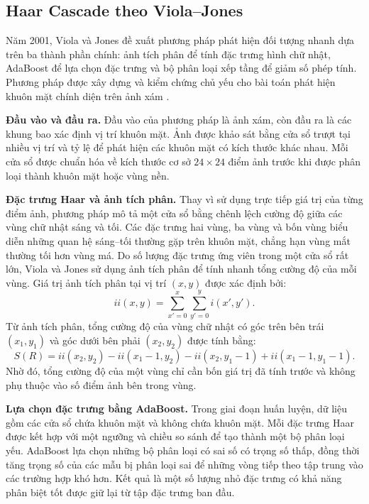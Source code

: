 \documentclass[../LuanVan.tex]{subfiles}
\begin{document}
\subsection{Haar Cascade theo Viola--Jones}
\label{subsection:2.2.1}

Năm 2001, Viola và Jones đề xuất phương pháp phát hiện đối tượng nhanh dựa trên ba thành phần chính: ảnh tích phân để tính đặc trưng hình chữ nhật, AdaBoost để lựa chọn đặc trưng và bộ phân loại xếp tầng để giảm số phép tính. Phương pháp được xây dựng và kiểm chứng chủ yếu cho bài toán phát hiện khuôn mặt chính diện trên ảnh xám \cite{viola2001rapid}.

\noindent\textbf{Đầu vào và đầu ra.} Đầu vào của phương pháp là ảnh xám, còn đầu ra là các khung bao xác định vị trí khuôn mặt. Ảnh được khảo sát bằng cửa sổ trượt tại nhiều vị trí và tỷ lệ để phát hiện các khuôn mặt có kích thước khác nhau. Mỗi cửa sổ được chuẩn hóa về kích thước cơ sở $24\times24$ điểm ảnh trước khi được phân loại thành khuôn mặt hoặc vùng nền.

\noindent\textbf{Đặc trưng Haar và ảnh tích phân.} Thay vì sử dụng trực tiếp giá trị của từng điểm ảnh, phương pháp mô tả một cửa sổ bằng chênh lệch cường độ giữa các vùng chữ nhật sáng và tối. Các đặc trưng hai vùng, ba vùng và bốn vùng biểu diễn những quan hệ sáng--tối thường gặp trên khuôn mặt, chẳng hạn vùng mắt thường tối hơn vùng má. Do số lượng đặc trưng ứng viên trong một cửa sổ rất lớn, Viola và Jones sử dụng ảnh tích phân để tính nhanh tổng cường độ của mỗi vùng. Giá trị ảnh tích phân tại vị trí $(x,y)$ được xác định bởi:
\begin{equation}
    ii(x,y)=\sum_{x'=0}^{x}\sum_{y'=0}^{y}i(x',y').
    \label{eq:integral_image}
\end{equation}
Từ ảnh tích phân, tổng cường độ của vùng chữ nhật có góc trên bên trái $(x_1,y_1)$ và góc dưới bên phải $(x_2,y_2)$ được tính bằng:
\begin{equation}
    S(R)=ii(x_2,y_2)-ii(x_1-1,y_2)-ii(x_2,y_1-1)+ii(x_1-1,y_1-1).
    \label{eq:rectangle_sum}
\end{equation}
Nhờ đó, tổng cường độ của một vùng chỉ cần bốn giá trị đã tính trước và không phụ thuộc vào số điểm ảnh bên trong vùng.

\noindent\textbf{Lựa chọn đặc trưng bằng AdaBoost.} Trong giai đoạn huấn luyện, dữ liệu gồm các cửa sổ chứa khuôn mặt và không chứa khuôn mặt. Mỗi đặc trưng Haar được kết hợp với một ngưỡng và chiều so sánh để tạo thành một bộ phân loại yếu. AdaBoost lựa chọn những bộ phân loại có sai số có trọng số thấp, đồng thời tăng trọng số của các mẫu bị phân loại sai để những vòng tiếp theo tập trung vào các trường hợp khó hơn. Kết quả là một số lượng nhỏ đặc trưng có khả năng phân biệt tốt được giữ lại từ tập đặc trưng ban đầu.
\end{document}
